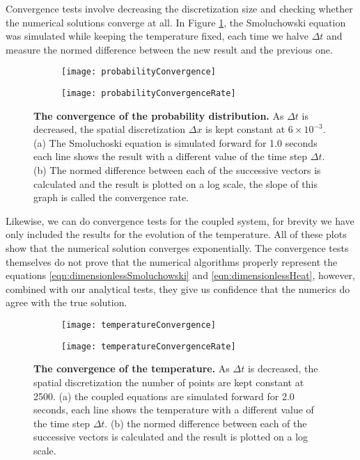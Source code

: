 Convergence tests involve decreasing the discretization size and checking whether the numerical solutions converge at all. In Figure \ref{fig:Convergence}, the Smoluchowski equation was simulated while keeping the temperature fixed, each time we halve $\Delta t$ and measure the normed difference between the new result and the previous one.


\begin{figure}
	\begin{subfigure}{0.49\textwidth}
		\texttt{[image: probabilityConvergence]}
	\end{subfigure}
	\begin{subfigure}{0.49\textwidth}
		\texttt{[image: probabilityConvergenceRate]}
	\end{subfigure}
\caption{\textbf{The convergence of the probability distribution.} As $\Delta t$ is decreased, the spatial discretization $\Delta x$ is kept constant at $6 \times 10^{-3}$. (a) The Smoluchoski equation is simulated forward for 1.0 seconds each line shows the result with a different value of the time step $\Delta t$. (b) The normed difference between each of the successive vectors is calculated and the result is plotted on  a log scale, the slope of this graph is called the convergence rate.}
\label{fig:Convergence}
\end{figure}

Likewise, we can do convergence tests for the coupled system, for brevity we have only included the results for the evolution of the temperature. All of these plots show that the numerical solution converges exponentially. The convergence tests themselves do not prove that the numerical algorithms properly represent the equations \ref{eqn:dimensionlessSmoluchowski} and \ref{eqn:dimensionlessHeat}, however, combined with our analytical tests, they give us confidence that the numerics do agree with the true solution.

\begin{figure}
	\begin{subfigure}{0.49\textwidth}
		\texttt{[image: temperatureConvergence]}
	\end{subfigure}
	\begin{subfigure}{0.49\textwidth}
		\texttt{[image: temperatureConvergenceRate]}
	\end{subfigure}
\caption{\textbf{The convergence of the temperature.} As $\Delta t$ is decreased, the spatial discretization the number of points are kept constant at 2500. (a) the coupled equations are simulated forward for 2.0 seconds, each line shows the temperature with a different value of the time step $\Delta t$. (b) the normed difference between each of the successive vectors is calculated and the result is plotted on  a log scale.}
\label{fig:temperatureConvergence}
\end{figure}

